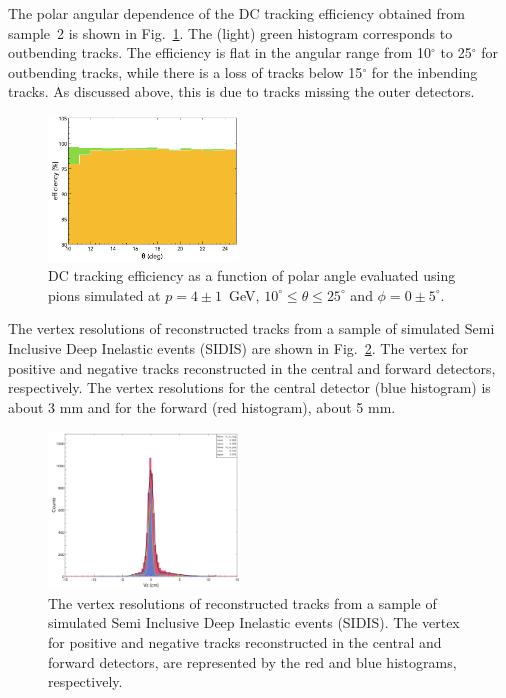 The polar angular dependence of the DC tracking efficiency obtained from sample~2 is shown in
Fig.~\ref{fig:trkeffinoutb}. The (light) green histogram corresponds to outbending tracks. The efficiency is flat
in the angular range from 10$^\circ$ to 25$^\circ$ for outbending tracks, while there is a loss of tracks below
15$^\circ$ for the inbending tracks. As discussed above, this is due to tracks missing the outer detectors.  
\begin{figure}[t]
\includegraphics[width=0.45\textwidth]{pics/DCTrkEffvsThetaInandOutbenders.png}
\caption{DC tracking efficiency as a function of polar angle evaluated using  pions  simulated at $p=4\pm 1$~GeV,
  $10^\circ \leq \theta \leq 25^\circ$ and $\phi = 0 \pm 5^\circ$.}
\label{fig:trkeffinoutb}
\end{figure}

The vertex resolutions of reconstructed tracks from a sample of simulated Semi Inclusive Deep Inelastic events (SIDIS) are shown in Fig.~\ref{fig:vtxres}.  The vertex for positive and negative tracks reconstructed  in the central and forward detectors, respectively.  The vertex resolutions for the central detector (blue histogram) is about 3 mm and for the forward (red histogram), about 5 mm. 
\begin{figure}[ht]
\includegraphics[width=0.45\textwidth]{pics/VertexResolution.png}
\caption{The vertex resolutions of reconstructed tracks from a sample of simulated Semi Inclusive Deep Inelastic events (SIDIS).  The vertex for positive and negative tracks reconstructed  in the central and forward detectors, are represented by the red and blue histograms, respectively.}
\label{fig:vtxres}
\end{figure}
\newpage
